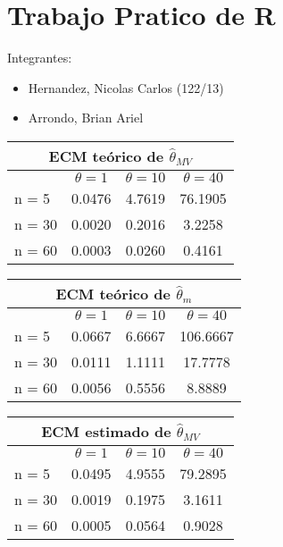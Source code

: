 \documentclass[a4paper,spanish]{report}
\begin{document}
\section*{Trabajo Pratico de R}
Integrantes: \\
\begin{itemize}
	\item Hernandez, Nicolas Carlos (122/13)
	\item Arrondo, Brian Ariel
\end{itemize}

\begin{table}[h!]
	\begin{tabular}{|l | c | c | c |}
		\hline
		\multicolumn{4}{|c|}{ECM te\'orico de $\hat{\theta}_{MV}$} \\	
		\hline
		 & $\theta = 1$ & $\theta = 10$ & $\theta = 40$  \\
		\hline 
		n = 5 & 0.0476 & 4.7619 & 76.1905\\
		\hline
		n = 30 & 0.0020 & 0.2016 & 3.2258\\
		\hline
		n = 60 & 0.0003 & 0.0260 & 0.4161\\
		\hline
	\end{tabular}
\end{table}

\begin{table}[h!]
	\begin{tabular}{|l | c | c | c |}
		\hline
		\multicolumn{4}{|c|}{ECM te\'orico de $\hat{\theta}_{m}$} \\	
		\hline
		 & $\theta = 1$ & $\theta = 10$ & $\theta = 40$  \\
		\hline 
		n = 5 & 0.0667 & 6.6667 & 106.6667\\
		\hline
		n = 30 & 0.0111 & 1.1111 & 17.7778\\
		\hline
		n = 60 & 0.0056 & 0.5556 & 8.8889\\
		\hline
	\end{tabular}
\end{table}

\begin{table}[h!]
	\begin{tabular}{|l | c | c | c |}
		\hline
		\multicolumn{4}{|c|}{ECM estimado de $\hat{\theta}_{MV}$} \\	
		\hline
		 & $\theta = 1$ & $\theta = 10$ & $\theta = 40$  \\
		\hline 
		n = 5 & 0.0495 & 4.9555 & 79.2895\\
		\hline
		n = 30 & 0.0019 & 0.1975 & 3.1611\\
		\hline
		n = 60 & 0.0005 & 0.0564 & 0.9028\\
		\hline
	\end{tabular}
\end{table}
\end{document}
